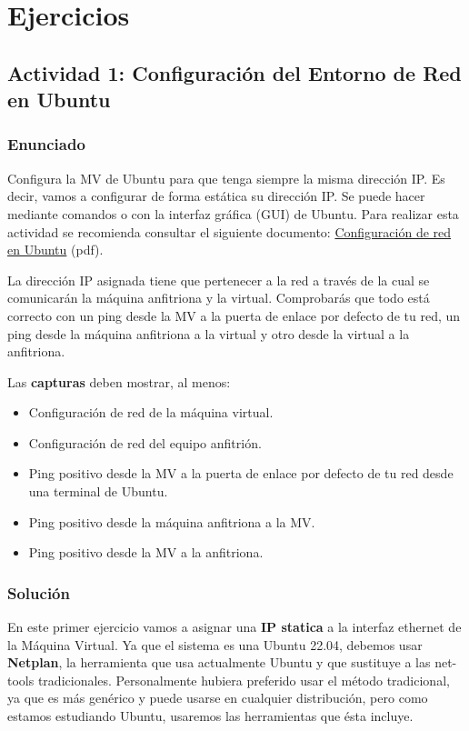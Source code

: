 \section{Ejercicios}

\subsection{Actividad 1: Configuración del Entorno de Red en Ubuntu}

\subsubsection{Enunciado}
Configura la MV de Ubuntu para que tenga siempre la misma dirección IP. Es decir, vamos a configurar de forma estática su dirección IP. Se puede hacer mediante comandos o con la interfaz gráfica (GUI) de Ubuntu. Para realizar esta actividad se recomienda consultar el siguiente documento: \href{https://www.juntadeandalucia.es/educacion/gestionafp/datos/tareas/DAM/SI_951965/2022-23/DAM_SI_9_2022-23_Individual__725769/Configuracion_de_red_para_Ubuntu.pdf}{Configuración de red en Ubuntu} (pdf).

La dirección IP asignada tiene que pertenecer a la red a través de la cual se comunicarán la máquina anfitriona y la virtual. Comprobarás que todo está correcto con un ping desde la MV a la puerta de enlace por defecto de tu red, un ping desde la máquina anfitriona a la virtual y otro desde la virtual a la anfitriona.

Las \textbf{capturas} deben mostrar, al menos:

\begin{itemize}
    \item Configuración de red de la máquina virtual.
    \item Configuración de red del equipo anfitrión.
    \item Ping positivo desde la MV a la puerta de enlace por defecto de tu red desde una terminal de Ubuntu.
    \item Ping positivo desde la máquina anfitriona a la MV.
    \item Ping positivo desde la MV a la anfitriona.
\end{itemize}

\subsubsection{Solución}
En este primer ejercicio vamos a asignar una \textbf{IP statica} a la interfaz ethernet de la Máquina Virtual. Ya que el sistema es una Ubuntu 22.04, debemos usar \textbf{Netplan}, la herramienta que usa actualmente Ubuntu y que sustituye a las net-tools tradicionales. Personalmente hubiera preferido usar el método tradicional, ya que es más genérico y puede usarse en cualquier distribución, pero como estamos estudiando Ubuntu, usaremos las herramientas que ésta incluye.

